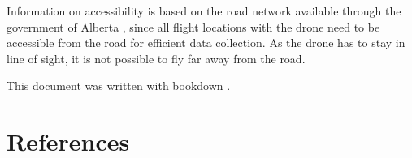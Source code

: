 \documentclass[
]{article}
\begin{document}
Information on accessibility is based on the road network available through the government of Alberta \autocite{GravelRoad2021,PavedRoad2021}, since all flight locations with the drone need to be accessible from the road for efficient data collection. As the drone has to stay in line of sight, it is not possible to fly far away from the road.

This document was written with bookdown \autocite{R-bookdown}.

\hypertarget{references}{%
\section{References}\label{references}}

\hypertarget{references}{}

\printbibliography
\end{document}
